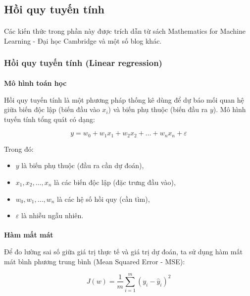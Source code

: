 \subsection{Hồi quy tuyến tính}
\paragraph{}{Các kiến thức trong phần này được trích dẫn từ sách Mathematics for Machine Learning \cite{deisenroth2020mathematics} - Đại học Cambridge và một số blog khác.} 
\label{label:lr}
\subsubsection{Hồi quy tuyến tính (Linear regression)}
\paragraph{}{\textbf{Mô hình toán học}}

Hồi quy tuyến tính \cite{mlcoban-linear-regression} là một phương pháp thống kê dùng để dự báo mối quan hệ giữa biến độc lập (biến đầu vào \( x_i \)) và biến phụ thuộc (biến đầu ra \( y \)). Mô hình tuyến tính tổng quát có dạng:

\begin{equation}
y = w_0 + w_1x_1 + w_2x_2 + \dots + w_nx_n + \varepsilon
\end{equation}

Trong đó:
\begin{itemize}
    \item \( y \) là biến phụ thuộc (đầu ra cần dự đoán),
    \item \( x_1, x_2, \dots, x_n \) là các biến độc lập (đặc trưng đầu vào),
    \item \( w_0, w_1, \dots, w_n \) là các hệ số hồi quy (cần tìm),
    \item \( \varepsilon \) là nhiễu ngẫu nhiên.
\end{itemize}

\paragraph{}{\textbf{Hàm mất mát}}

Để đo lường sai số giữa giá trị thực tế và giá trị dự đoán, ta sử dụng hàm mất mát bình phương trung bình (Mean Squared Error - MSE):

\begin{equation}
J(w) = \frac{1}{m} \sum_{i=1}^{m} (y_i - \hat{y}_i)^2
\end{equation}

